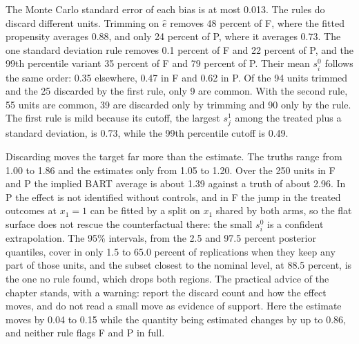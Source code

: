 The Monte Carlo standard error of each bias is at most 0.013. The rules do discard different units. Trimming on $\hat e$ removes 48 percent of F, where the fitted propensity averages 0.88, and only 24 percent of P, where it averages 0.73. The one standard deviation rule removes 0.1 percent of F and 22 percent of P, and the 99th percentile variant 35 percent of F and 79 percent of P. Their mean $s_i^0$ follows the same order: 0.35 elsewhere, 0.47 in F and 0.62 in P. Of the 94 units trimmed and the 25 discarded by the first rule, only 9 are common. With the second rule, 55 units are common, 39 are discarded only by trimming and 90 only by the rule. The first rule is mild because its cutoff, the largest $s_j^1$ among the treated plus a standard deviation, is 0.73, while the 99th percentile cutoff is 0.49.

Discarding moves the target far more than the estimate. The truths range from 1.00 to 1.86 and the estimates only from 1.05 to 1.20. Over the 250 units in F and P the implied BART average is about 1.39 against a truth of about 2.96. In P the effect is not identified without controls, and in F the jump in the treated outcomes at $x_1 = 1$ can be fitted by a split on $x_1$ shared by both arms, so the flat surface does not rescue the counterfactual there: the small $s_i^0$ is a confident extrapolation. The 95\% intervals, from the 2.5 and 97.5 percent posterior quantiles, cover in only 1.5 to 65.0 percent of replications when they keep any part of those units, and the subset closest to the nominal level, at 88.5 percent, is the one no rule found, which drops both regions. The practical advice of the chapter stands, with a warning: report the discard count and how the effect moves, and do not read a small move as evidence of support. Here the estimate moves by 0.04 to 0.15 while the quantity being estimated changes by up to 0.86, and neither rule flags F and P in full.

